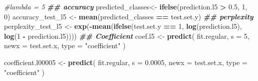 \documentclass[
]{article}
\newenvironment{Shaded}{\begin{snugshade}}{\end{snugshade}}
\newcommand{\AttributeTok}[1]{\textcolor[rgb]{0.13,0.29,0.53}{#1}}
\newcommand{\CommentTok}[1]{\textcolor[rgb]{0.56,0.35,0.01}{\textit{#1}}}
\newcommand{\DecValTok}[1]{\textcolor[rgb]{0.00,0.00,0.81}{#1}}
\newcommand{\DocumentationTok}[1]{\textcolor[rgb]{0.56,0.35,0.01}{\textbf{\textit{#1}}}}
\newcommand{\FloatTok}[1]{\textcolor[rgb]{0.00,0.00,0.81}{#1}}
\newcommand{\FunctionTok}[1]{\textcolor[rgb]{0.13,0.29,0.53}{\textbf{#1}}}
\newcommand{\NormalTok}[1]{#1}
\newcommand{\OtherTok}[1]{\textcolor[rgb]{0.56,0.35,0.01}{#1}}
\newcommand{\SpecialCharTok}[1]{\textcolor[rgb]{0.81,0.36,0.00}{\textbf{#1}}}
\newcommand{\StringTok}[1]{\textcolor[rgb]{0.31,0.60,0.02}{#1}}
\begin{document}
\begin{Shaded}
\begin{Highlighting}[]
\CommentTok{\#lambda = 5}
\DocumentationTok{\#\# accuracy}
\NormalTok{predicted\_classes}\OtherTok{\textless{}{-}} \FunctionTok{ifelse}\NormalTok{(prediction.l5 }\SpecialCharTok{\textgreater{}} \FloatTok{0.5}\NormalTok{, }\DecValTok{1}\NormalTok{, }\DecValTok{0}\NormalTok{)}
\NormalTok{accuracy\_test\_l5 }\OtherTok{\textless{}{-}} \FunctionTok{mean}\NormalTok{(predicted\_classes }\SpecialCharTok{==}\NormalTok{ test.set.y)}
\DocumentationTok{\#\# perplexity }
\NormalTok{perplexity\_test\_l5 }\OtherTok{\textless{}{-}} 
  \FunctionTok{exp}\NormalTok{(}\SpecialCharTok{{-}}\FunctionTok{mean}\NormalTok{(}\FunctionTok{ifelse}\NormalTok{(test.set.y }\SpecialCharTok{==} \DecValTok{1}\NormalTok{, }\FunctionTok{log}\NormalTok{(prediction.l5), }\FunctionTok{log}\NormalTok{(}\DecValTok{1} \SpecialCharTok{{-}}\NormalTok{ prediction.l5))))}
\DocumentationTok{\#\# Coefficient}
\NormalTok{coef.l5 }\OtherTok{\textless{}{-}}  
  \FunctionTok{predict}\NormalTok{(}
\NormalTok{    fit.regular, }
    \AttributeTok{s =} \DecValTok{5}\NormalTok{, }
    \AttributeTok{newx =}\NormalTok{ test.set.x,}
    \AttributeTok{type =} \StringTok{"coefficient"}
\NormalTok{    )}

\NormalTok{coefficient.l00005 }\OtherTok{\textless{}{-}}  
  \FunctionTok{predict}\NormalTok{(}
\NormalTok{    fit.regular, }
    \AttributeTok{s =} \FloatTok{0.0005}\NormalTok{, }
    \AttributeTok{newx =}\NormalTok{ test.set.x,}
    \AttributeTok{type =} \StringTok{"coefficient"}
\NormalTok{    )}
\end{Highlighting}
\end{Shaded}
\end{document}
